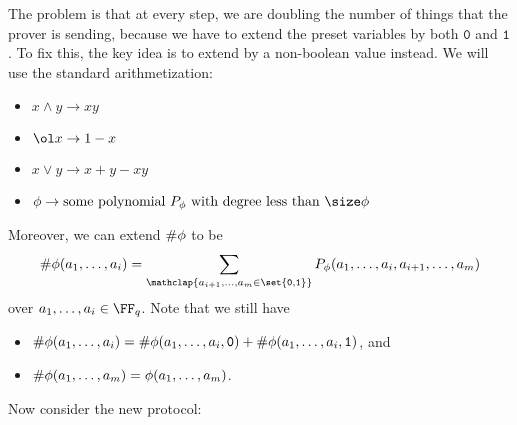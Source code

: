 \documentclass{standalone}
\begin{document}
The problem is that at every step, we are doubling the number of things that
the prover is sending, because we have to extend the preset variables
by both \(\mathtt 0\) and \(\mathtt 1\).
To fix this, the key idea is to extend by a non-boolean value instead.
We will use the standard arithmetization:
\begin{itemize}[nosep]
  \item \(x \land y \to xy\)
  \item \(\ol x \to 1 - x\)
  \item \(x \lor y \to x + y - xy\)
  \item \(\phi \to \text{some polynomial $P_\phi$ with degree
    less than $\size \phi$}\)
\end{itemize}
Moreover, we can extend \(\textsf\#\phi\) to be
\[
  \numphi(a_1, \dots, a_i) =
    \sum_{\mathclap{a_{i + 1}, \dots, a_{m} \in \set{\mathtt 0, \mathtt 1}}}
      P_\phi(a_1, \dots, a_i, a_{i + 1}, \dots, a_{m})
\]
over \(a_1, \dots, a_i \in \FF_q\).
Note that we still have
\begin{itemize}
  \item \(\textsf\#\phi(a_1, \dots, a_i) = \textsf\#\phi(a_1, \dots, a_i, \mathtt 0) +
                                     \textsf\#\phi(a_1, \dots, a_i, \mathtt 1)\), and
  \item \(\textsf\#\phi(a_1, \dots, a_m) = \phi(a_1, \dots, a_m)\).
\end{itemize}
Now consider the new protocol:
\end{document}

